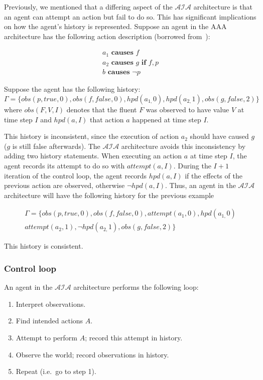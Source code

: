Previously, we mentioned that a differing aspect of the $\mathcal{AIA}$ architecture is that an agent can attempt an action but fail to do so.
This has significant implications on how the agent's history is represented.
Suppose an agent in the AAA architecture has the following action description (borrowed from~\citep{blount_towards_2014}):

\begin{gather*}
    a_1 \textbf{ causes } f \\
    a_2 \textbf{ causes } g \textbf{ if } f, p \\
    b \textbf{ causes } \neg p
\end{gather*}

Suppose the agent has the following history:
\[
\Gamma=\{obs\left(p,true,0\right),obs\left(f,false,0\right),hpd\left(a_{1,}0\right),hpd\left(a_{2,}1\right),obs\left(g,false,2\right)\}
\]
where $obs(F, V, I)$ denotes that the fluent $F$ was observed to have value $V$ at time step $I$ and $hpd(a, I)$ that action $a$ happened at time step $I$.

This history is inconsistent, since the execution of action $a_2$ should have caused $g$ ($g$ is still false afterwards).
The $\mathcal{AIA}$ architecture avoids this inconsistency by adding two history statements.
When executing an action $a$ at time step $I$, the agent records its attempt to do so with $attempt(a, I)$.
During the $I+1$ iteration of the control loop, the agent records $hpd(a, I)$ if the effects of the previous action are observed, otherwise $\neg hpd(a, I)$.
Thus, an agent in the $\mathcal{AIA}$ architecture will have the following history for the previous example

\begin{multline*}
    \Gamma=\{
        obs\left(p,true,0\right),obs\left(f,false,0\right),attempt(a_1, 0),hpd\left(a_{1,}0\right) \\
        attempt(a_2, 1), \neg hpd\left(a_{2,}1\right),obs\left(g,false,2\right)
    \}
\end{multline*}

This history is consistent.

\subsubsection{Control loop}
\label{subsubsec:control_loop}

An agent in the $\mathcal{AIA}$ architecture performs the following loop:

\begin{enumerate}
    \item Interpret observations.
    \item Find intended actions $A$.
    \item Attempt to perform $A$;
        record this attempt in history.
    \item Observe the world;
        record observations in history.
    \item Repeat (i.e.~go to step 1).
\end{enumerate}

